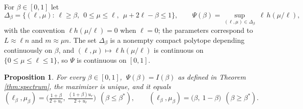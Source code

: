 \documentclass[11pt]{amsart}
\newtheorem{proposition}[theorem]{Proposition}
\theoremstyle{definition}
\theoremstyle{remark}
\begin{document}
For $\beta\in[0,1]$ let
\[
\Delta_\beta=\Big\{(\ell,\mu):\ \ell\ge\beta,\ \ 0\le\mu\le\ell,\ \ \mu+2\ell-\beta\le1\Big\},
\qquad
\Psi(\beta)=\sup_{(\ell,\mu)\in \Delta_\beta}\ \ell\, h(\mu/\ell),
\]
with the convention $\ell h(\mu/\ell)=0$ when $\ell=0$; the parameters correspond to $L\approx\ell n$ and $m\approx\mu n$. The set $\Delta_\beta$ is a nonempty compact polytope depending continuously on $\beta$, and $(\ell,\mu)\mapsto\ell h(\mu/\ell)$ is continuous on $\{0\le\mu\le\ell\le1\}$, so $\Psi$ is continuous on $[0,1]$.

\begin{proposition}\label{prop:variational}
For every $\beta\in[0,1]$, $\ \Psi(\beta)=I(\beta)$ as defined in Theorem \ref{thm:spectrum}, the maximizer is unique, and it equals
\[
(\ell_\beta,\mu_\beta)=
\Big(\tfrac{1+\beta}{2+u_r},\ \tfrac{(1+\beta)u_r}{2+u_r}\Big)\ \ (\beta\le\beta^{*}),
\qquad
(\ell_\beta,\mu_\beta)=\big(\beta,\ 1-\beta\big)\ \ (\beta\ge\beta^{*}).
\]
\end{proposition}
\end{document}
